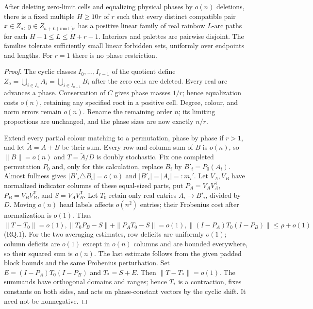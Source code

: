 \begin{lemma}\label{rou:power}\label{pq:comparison}\label{pq:power-gap}\label{periodic:power-gap}\label{pq:connectors}\label{periodic:connectors}
After deleting zero-limit cells and equalizing physical phases by $o(n)$ deletions, there is a fixed multiple $H\ge10r$ of $r$ such that every distinct compatible pair $x\in{}Z_a$, $y\in{}Z_{a+L\pmod{}r}$ has a positive linear family of real rainbow $L$-arc paths for each $H-1\le{}L\le{}H+r-1$. Interiors and palettes are pairwise disjoint. The families tolerate sufficiently small linear forbidden sets, uniformly over endpoints and lengths. For $r=1$ there is no phase restriction.
\end{lemma}
\begin{proof}
The cyclic classes $I_0,\ldots,I_{r-1}$ of the quotient define $Z_a=\bigcup_{i\in{}I_a}A_i=\bigcup_{i\in{}I_{a-1}}B_i$ after the zero cells are deleted. Every real arc advances a phase. Conservation
of $C$ gives phase masses $1/r$; hence equalization costs $o(n)$, retaining any specified root in a positive cell. Degree, colour, and
norm errors remain $o(n)$. Rename the remaining order $n$; its limiting proportions are unchanged, and the phase sizes are now
exactly $n/r$.

Extend every partial colour matching to a permutation, phase by phase
if $r>1$, and let $\widetilde{A}=A+B$ be their sum. Every row and column sum of $B$ is $o(n)$, so $\|B\|=o(n)$ and $T=\widetilde{A}/D$ is doubly stochastic. Fix one completed permutation $P_0$ and, only for this calculation, replace $B_i$ by $B'_i=P_0(A_i)$. Almost fullness gives $|B'_i\triangle{}B_i|=o(n)$ and $|B'_i|=|A_i|=:m_i'$. Let $V_A,V_B$ have normalized indicator columns of these equal-sized parts, put $P_A=V_AV_A^{\mathsf{T}}$, $P_B=V_BV_B^{\mathsf{T}}$, and $S=V_AV_B^{\mathsf{T}}$. Let $T_0$ retain only real entries $A_i\to{}B'_i$, divided by $D$. Moving $o(n)$ head labels affects $o(n^2)$ entries; their Frobenius cost after normalization is $o(1)$. Thus $\|T-T_0\|=o(1),\|T_0P_B-S\|+\|P_AT_0-S\|=o(1),\|(I-P_A)T_0(I-P_B)\|\le\rho+o(1)$ \textup{(RQ.1)}. For the two averaging estimates, row deficits are uniformly $o(1)$; column deficits are $o(1)$ except in $o(n)$ columns and are bounded everywhere, so their squared sum is $o(n)$. The last estimate follows from the given padded block bounds and the same Frobenius perturbation.
Set $E=(I-P_A)T_0(I-P_B)$ and $T_*=S+E$. Then $\|T-T_*\|=o(1)$. The summands have orthogonal domains and ranges; hence $T_*$ is a contraction, fixes constants on both sides, and acts on phase-constant
vectors by the cyclic shift. It need not be nonnegative.


\end{proof}
